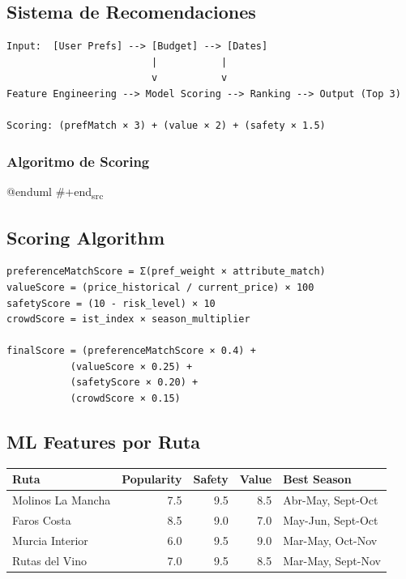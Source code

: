 \documentclass[11pt]{article}
\begin{document}
\subsection{Sistema de Recomendaciones}
\label{sec:orgd82b968}

\begin{verbatim}
Input:  [User Prefs] --> [Budget] --> [Dates]
                         |           |
                         v           v
Feature Engineering --> Model Scoring --> Ranking --> Output (Top 3)

Scoring: (prefMatch × 3) + (value × 2) + (safety × 1.5)
\end{verbatim}

\subsubsection{Algoritmo de Scoring}
\label{sec:org7e757d1}

@enduml
\#+end\textsubscript{src}

\subsection{Scoring Algorithm}
\label{sec:orgbe5041b}

\begin{verbatim}
preferenceMatchScore = Σ(pref_weight × attribute_match)
valueScore = (price_historical / current_price) × 100
safetyScore = (10 - risk_level) × 10
crowdScore = ist_index × season_multiplier

finalScore = (preferenceMatchScore × 0.4) + 
           (valueScore × 0.25) + 
           (safetyScore × 0.20) + 
           (crowdScore × 0.15)
\end{verbatim}

\subsection{ML Features por Ruta}
\label{sec:orgd35ecb0}

\begin{center}
\begin{tabular}{lrrrl}
Ruta & Popularity & Safety & Value & Best Season\\
\hline
Molinos La Mancha & 7.5 & 9.5 & 8.5 & Abr-May, Sept-Oct\\
Faros Costa & 8.5 & 9.0 & 7.0 & May-Jun, Sept-Oct\\
Murcia Interior & 6.0 & 9.5 & 9.0 & Mar-May, Oct-Nov\\
Rutas del Vino & 7.0 & 9.5 & 8.5 & Mar-May, Sept-Nov\\
\end{tabular}
\end{center}
\end{document}
